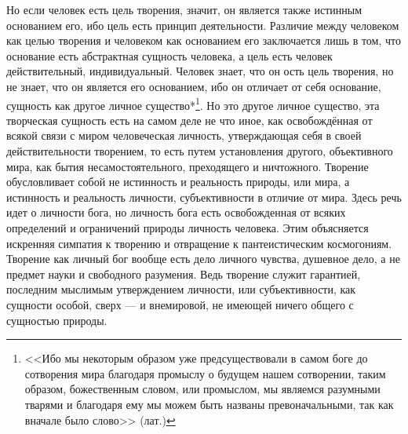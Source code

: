 \documentclass[12pt,oneside]{book}
\begin{document}
Но если человек есть цель творения, значит, он является также истинным основанием его, ибо цель есть принцип деятельности. Различие между человеком как целью творения и человеком как основанием его заключается лишь в том, что основание есть абстрактная сущность человека, а цель есть человек действительный, индивидуальный. Человек знает, что он ость цель творения, но не знает, что он является его основанием, ибо он отличает от себя основание, сущность как другое личное существо*\let\svthefootnote\thefootnote\let\thefootnote\relax{}\let\thefootnote\svthefootnote\footnote{<<Ибо мы некоторым образом уже предсуществовали в самом боге до сотворения мира благодаря промыслу о будущем нашем сотворении, таким образом, божественным словом, или промыслом, мы являемся разумными тварями и благодаря ему мы можем быть названы превоначальными, так как вначале было слово>> (лат.)}. Но это другое личное существо, эта творческая сущность есть на самом деле не что иное, как освобождённая от всякой связи с миром человеческая личность, утверждающая себя в своей действительности творением, то есть путем установления другого, объективного мира, как бытия несамостоятельного, преходящего и ничтожного. Творение обусловливает собой не истинность и реальность природы, или мира, а истинность и реальность личности, субъективности в отличие от мира. Здесь речь идет о личности бога, но личность бога есть освобожденная от всяких определений и ограничений природы личность человека. Этим объясняется искренняя симпатия к творению и отвращение к пантеистическим космогониям. Творение как личный бог вообще есть дело личного чувства, душевное дело, а не предмет науки и свободного разумения. Ведь творение служит гарантией, последним мыслимым утверждением личности, или субъективности, как сущности особой, сверх --- и внемировой, не имеющей ничего общего с сущностью природы\dag\let\svthefootnote\thefootnote\let\thefootnote\relax{}\let\thefootnote\svthefootnote.
\end{document}
